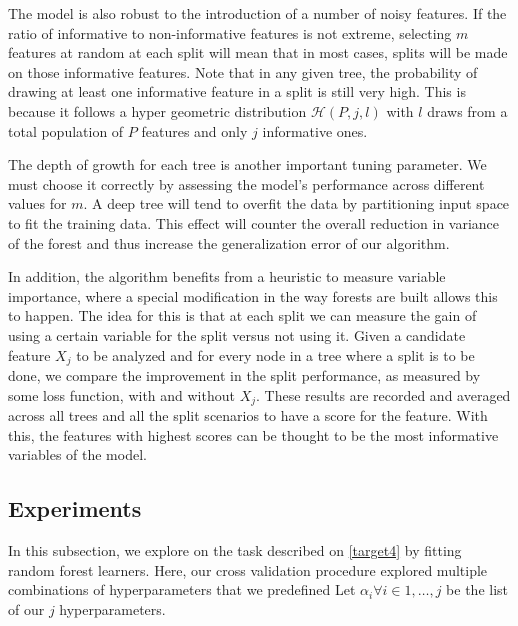The model is also robust to the introduction of a number of noisy features.
If the ratio of informative to non-informative features is not extreme, selecting $m$ features at random at each split will mean that in most cases, splits will be made on those informative features.
Note that in any given tree, the probability of drawing at least one informative feature in a split is still very high.
This is because it follows a hyper geometric distribution $\mathcal{H}(P,j,l)$ with $l$ draws from a total population of $P$ features and only $j$ informative ones.

The depth of growth for each tree is another important tuning parameter.
We must choose it correctly by assessing the model's performance across different values for $m$.
A deep tree will tend to overfit the data by partitioning input space to fit the training data.
This effect will counter the overall reduction in variance of the forest and thus increase the generalization error of our algorithm.


In addition, the algorithm benefits from a heuristic to measure variable importance, where a special modification in the way forests are built allows this to happen.
The idea for this is that at each split we can measure the gain of using a certain variable for the split versus not using it.
Given a candidate feature $X_j$ to be analyzed and for every node in a tree where a split is to be done, we compare the improvement in the split performance, as measured by some loss function, with and without $X_j$.
These results are recorded and averaged across all trees and all the split scenarios to have a score for the feature.
With this, the features with highest scores can be thought to be the most informative variables of the model.

\subsection{Experiments}\label{subsection:random_forests_experiments}

In this subsection, we explore on the task described on \cref{target4} by fitting random forest learners.
Here, our cross validation procedure explored multiple combinations of hyperparameters that we predefined Let $\alpha_i \forall i \in {1,\ldots,j}$ be the list of our $j$ hyperparameters.


